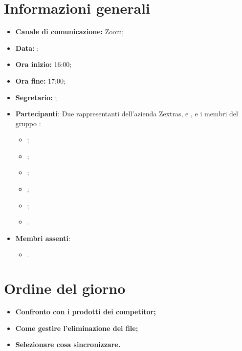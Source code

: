 \section{Informazioni generali}

\begin{itemize}

    \item \textbf{Canale di comunicazione:} Zoom;

    \item \textbf{Data:} \DataMeeting{};

    \item \textbf{Ora inizio:} 16:00;

    \item \textbf{Ora fine:} 17:00;

    \item \textbf{Segretario:} \ACapoRedazione{};

    \item \textbf{Partecipanti}: Due rappresentanti dell'azienda Zextras, \textit{\Alessio{}} e \textit{\Federico{}}, e i membri del gruppo \Gruppo{}:
        \begin{itemize}
            \item \Daniele{};
            \item \Davide{};
            \item \Francesco{};
            \item \Giosue{};
            \item \Lucrezia{};
            \item \Matteo{}.
        \end{itemize}
    \item \textbf{Membri assenti}:
        \begin{itemize}
            \item \Tommaso{}.
        \end{itemize}
\end{itemize}

\section{Ordine del giorno}

\begin{itemize}
    \item\textbf{Confronto con i prodotti dei competitor;}
    \item\textbf{Come gestire l'eliminazione dei file;}
    \item\textbf{Selezionare cosa sincronizzare.}
\end{itemize}
\newpage


